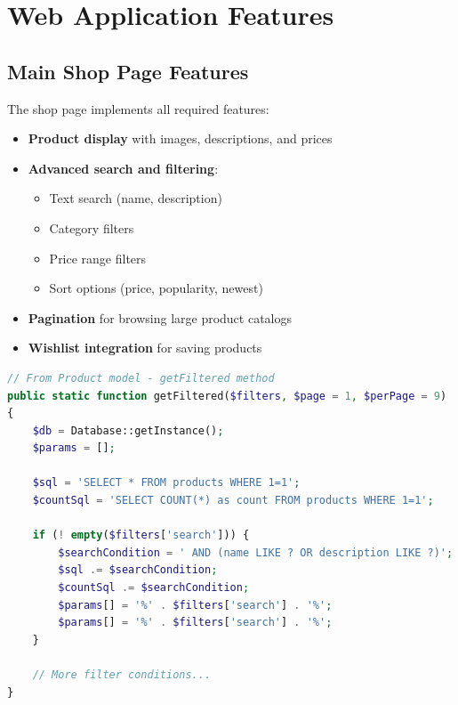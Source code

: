 \documentclass{article}
\begin{document}
\section{Web Application Features}

\subsection{Main Shop Page Features}
The shop page implements all required features:
\begin{itemize}
    \item \textbf{Product display} with images, descriptions, and prices
    \item \textbf{Advanced search and filtering}:
        \begin{itemize}
            \item Text search (name, description)
            \item Category filters
            \item Price range filters
            \item Sort options (price, popularity, newest)
        \end{itemize}
    \item \textbf{Pagination} for browsing large product catalogs
    \item \textbf{Wishlist integration} for saving products
\end{itemize}

\begin{lstlisting}[language=PHP, caption=Shop filtering implementation]
// From Product model - getFiltered method
public static function getFiltered($filters, $page = 1, $perPage = 9)
{
    $db = Database::getInstance();
    $params = [];

    $sql = 'SELECT * FROM products WHERE 1=1';
    $countSql = 'SELECT COUNT(*) as count FROM products WHERE 1=1';

    if (! empty($filters['search'])) {
        $searchCondition = ' AND (name LIKE ? OR description LIKE ?)';
        $sql .= $searchCondition;
        $countSql .= $searchCondition;
        $params[] = '%' . $filters['search'] . '%';
        $params[] = '%' . $filters['search'] . '%';
    }
    
    // More filter conditions...
}
\end{lstlisting}
\end{document}
